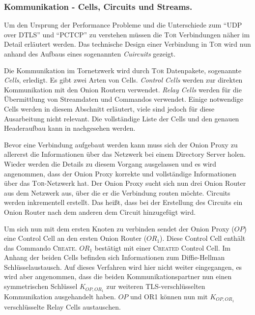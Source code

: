 \documentclass[fleqn,envcountsame,runningheads,10pt,a4paper]{llncs}
\begin{document}
\subsubsection{Kommunikation - Cells, Circuits und Streams.}
\label{sec:communication}

Um den Ursprung der Performance Probleme und die Unterschiede zum ``UDP over DTLS'' und ``PCTCP'' zu verstehen müssen die \textsc{Tor} Verbindungen näher im Detail erläutert werden. Das technische Design einer Verbindung in \textsc{Tor} wird nun anhand des Aufbaus eines sogenannten \textit{Cuircuits} gezeigt.

Die Kommunikation im Tornetzwerk wird durch \textsc{Tor} Datenpakete, sogenannte \textit{Cells}, erledigt. Es gibt zwei Arten von Cells. \textit{Control Cells} werden zur direkten Kommunikation mit den Onion Routern verwendet. \textit{Relay Cells} werden für die Übermittlung von Streamdaten und Commandos verwendet. Einige notwendige Cells werden in diesem Abschnitt erläutert, viele sind jedoch für diese Ausarbeitung nicht relevant. Die vollständige Liste der Cells und den genauen Headeraufbau kann in \cite{tor} nachgesehen werden.

Bevor eine Verbindung aufgebaut werden kann muss sich der Onion Proxy zu allererst die Informationen über das Netzwerk bei einem Directory Server holen. Wieder werden die Details zu diesem Vorgang ausgelassen und es wird angenommen, dass der Onion Proxy korrekte und vollständige Informationen über das \textsc{Tor}-Netzwerk hat. Der Onion Proxy sucht sich nun drei Onion Router aus dem Netzwerk aus, über die er die Verbindung routen möchte. Circuits werden inkrementell erstellt. Das heißt, dass bei der Erstellung des Circuits ein Onion Router nach dem anderen dem Circuit hinzugefügt wird.

Um sich nun mit dem ersten Knoten zu verbinden sendet der Onion Proxy ($\textit{OP}$) eine Control Cell an den ersten Onion Router ($\textit{OR}_1$). Diese Control Cell enthält das Commando \textsc{Create}. $\textit{OR}_1$ bestätigt mit einer \textsc{Created} Control Cell. Im Anhang der beiden Cells befinden sich Informationen zum Diffie-Hellman Schlüsselaustausch\cite{dh}. Auf dieses Verfahren wird hier nicht weiter eingegangen, es wird aber angenommen, dass die beiden Kommunikationspartner nun einen symmetrischen Schlüssel $K_{OP,OR_1}$ zur weiteren TLS-verschlüsselten\cite{rfc:tls} Kommunikation ausgehandelt haben. $\textit{OP}$ und OR1 können nun mit $K_{OP,OR_1}$ verschlüsselte Relay Cells austauschen. 
\end{document}
